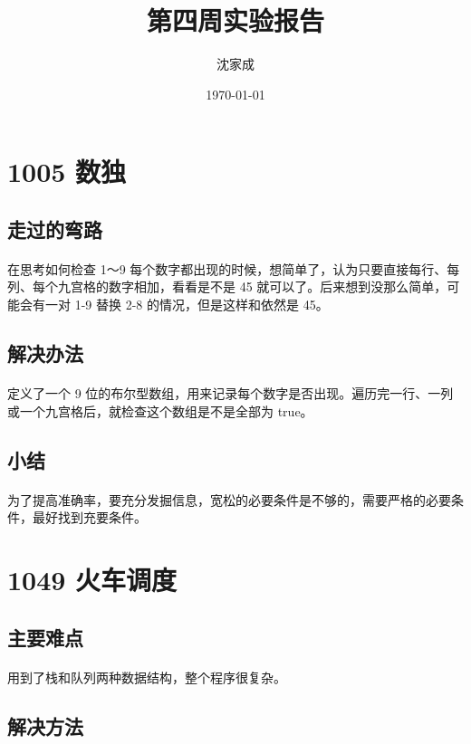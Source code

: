 \documentclass[UTF-8, 12pt]{ctexart}
\title{第四周实验报告}
\author{沈家成}
\date{\today}
\begin{document}
\maketitle
\section{1005 数独}
    \subsection{走过的弯路}
    \paragraph{}
    在思考如何检查 1～9 每个数字都出现的时候，想简单了，认为只要直接每行、每列、每个九宫格的数字相加，看看是不是 45 就可以了。后来想到没那么简单，可能会有一对 1-9 替换 2-8 的情况，但是这样和依然是 45。
    \subsection{解决办法}
    \paragraph{}
    定义了一个 9 位的布尔型数组，用来记录每个数字是否出现。遍历完一行、一列或一个九宫格后，就检查这个数组是不是全部为 true。
    \subsection{小结}
    \paragraph{}
    为了提高准确率，要充分发掘信息，宽松的必要条件是不够的，需要严格的必要条件，最好找到充要条件。

\section{1049 火车调度}
    \subsection{主要难点}
    \paragraph{}
    用到了栈和队列两种数据结构，整个程序很复杂。
    \subsection{解决方法}
\end{document}
